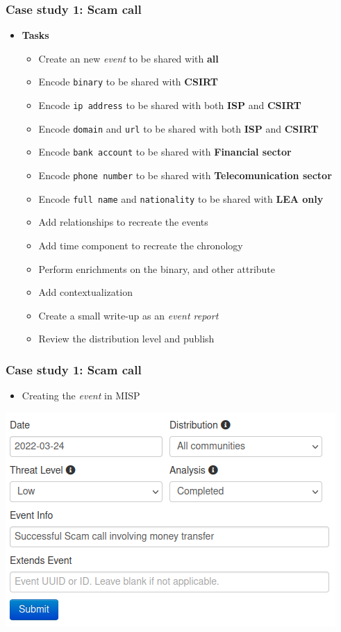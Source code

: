 \begin{frame}
    \frametitle{Case study 1: Scam call}
    \begin{itemize}
        \item[] \textbf{Tasks}
        \begin{itemize}
            \item Create an new \textit{event} to be shared with \textbf{all}
            \item Encode \texttt{binary} to be shared with \textbf{CSIRT}
            \item Encode \texttt{ip address} to be shared with both \textbf{ISP} and \textbf{CSIRT}
            \item Encode \texttt{domain} and \texttt{url} to be shared with both \textbf{ISP} and \textbf{CSIRT}
            \item Encode \texttt{bank account} to be shared with \textbf{Financial sector}
            \item Encode \texttt{phone number} to be shared with \textbf{Telecomunication sector}
            \item Encode \texttt{full name} and \texttt{nationality} to be shared with \textbf{LEA only}
            \item Add relationships to recreate the events
            \item Add time component to recreate the chronology
            \item Perform enrichments on the binary, and other attribute
            \item Add contextualization
            \item Create a small write-up as an \textit{event report}
            \item Review the distribution level and publish
        \end{itemize}
    \end{itemize}
\end{frame}

\begin{frame}
    \frametitle{Case study 1: Scam call}
    \begin{itemize}
        \item Creating the \textit{event} in MISP
    \end{itemize}
    \includegraphics[width=1.0\linewidth]{pictures/case1/event.png}
\end{frame}

